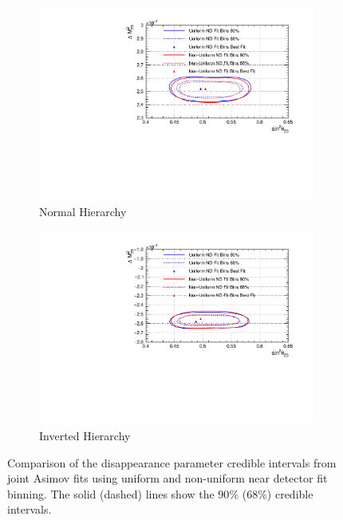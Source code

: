 \begin{figure}[!htbp]
\centering
\begin{subfigure}{.7\textwidth}
  \centering
  \includegraphics[width=0.95\linewidth]{figs/compMaCh3Contours_TH2DvsTHPoly_asimov/compMaCh3Contours_TH2DvsTHPoly_disapp_asimovA_NH}
  \caption{Normal Hierarchy}
  \label{fig:TH2DPolyDisNH}
\end{subfigure}
\begin{subfigure}{.7\textwidth}
  \centering
  \includegraphics[width=0.95\linewidth]{figs/compMaCh3Contours_TH2DvsTHPoly_asimov/compMaCh3Contours_TH2DvsTHPoly_disapp_asimovA_IH}
  \caption{Inverted Hierarchy}
  \label{fig:TH2DPolyDisIH}
\end{subfigure}
\caption{Comparison of the disappearance parameter credible intervals from joint Asimov fits using uniform and non-uniform near detector fit binning. The solid (dashed) lines show the 90$\%$ ($68\%$) credible intervals.}
\label{fig:TH2DPolyDis}
\end{figure}

